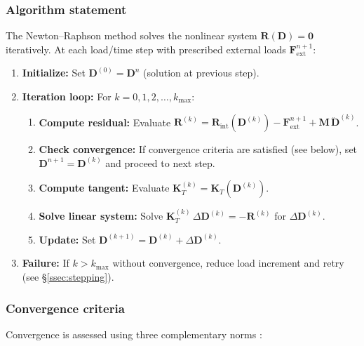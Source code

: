 \documentclass[11pt]{article}
\begin{document}
\subsubsection{Algorithm statement}

The Newton--Raphson method solves the nonlinear system
$\mathbf{R}(\mathbf{D})=\mathbf{0}$ iteratively. At each load/time
step with prescribed external loads $\mathbf{F}_{\mathrm{ext}}^{n+1}$:

\begin{enumerate}
\item \textbf{Initialize:}
  Set $\mathbf{D}^{(0)}=\mathbf{D}^{n}$ (solution at previous step).

\item \textbf{Iteration loop:} For $k=0,1,2,\ldots,k_{\max}$:
  \begin{enumerate}
  \item \textbf{Compute residual:}
    Evaluate $\mathbf{R}^{(k)}=\mathbf{R}_{\mathrm{int}}(\mathbf{D}^{(k)})
    - \mathbf{F}_{\mathrm{ext}}^{n+1}
    + \mathbf{M}\,\ddot{\mathbf{D}}^{(k)}$.

  \item \textbf{Check convergence:}
    If convergence criteria are satisfied (see below), set
    $\mathbf{D}^{n+1}=\mathbf{D}^{(k)}$ and proceed to next step.

  \item \textbf{Compute tangent:}
    Evaluate $\mathbf{K}_{T}^{(k)}=\mathbf{K}_{T}(\mathbf{D}^{(k)})$.

  \item \textbf{Solve linear system:}
    Solve $\mathbf{K}_{T}^{(k)}\,\Delta\mathbf{D}^{(k)}
    = -\mathbf{R}^{(k)}$ for $\Delta\mathbf{D}^{(k)}$.

  \item \textbf{Update:}
    Set $\mathbf{D}^{(k+1)}=\mathbf{D}^{(k)}+\Delta\mathbf{D}^{(k)}$.
  \end{enumerate}

\item \textbf{Failure:}
  If $k>k_{\max}$ without convergence, reduce load increment and
  retry (see \S\ref{ssec:stepping}).
\end{enumerate}

\subsubsection{Convergence criteria}
\label{ssec:convergence}

Convergence is assessed using three complementary norms
\cite{Bathe2006,Belytschko2000,ZienkiewiczTaylor2000}:
\end{document}
